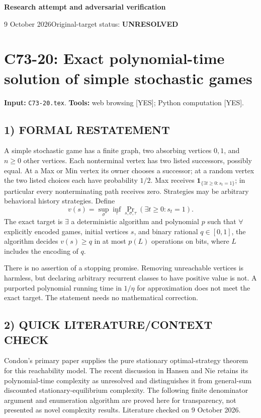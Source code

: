 \documentclass[11pt,a4paper]{article}
\theoremstyle{definition}
\theoremstyle{remark}
\begin{document}
{\large\bfseries Research attempt and adversarial verification}\par
9 October 2026\hfill Original-target status: \textbf{UNRESOLVED}\par
\section{C73-20: Exact polynomial-time solution of simple stochastic games}
\label{sec:C73-20}
\noindent\textbf{Input:} \texttt{C73-20.tex}. \quad\textbf{Tools:} web browsing [YES]; Python computation [YES].
\subsection*{1) FORMAL RESTATEMENT}
A simple stochastic game has a finite graph, two absorbing vertices $0,1$, and $n\geq0$ other vertices. Each nonterminal vertex has two listed successors, possibly equal. At a Max or Min vertex its owner chooses a successor; at a random vertex the two listed choices each have probability $1/2$. Max receives $\mathbf1_{\{\exists t\geq0:s_t=1\}}$; in particular every nonterminating path receives zero. Strategies may be arbitrary behavioral history strategies. Define
\[
 v(s)=\sup_\sigma\inf_\tau\Pr_{s,\sigma,\tau}(\exists t\geq0:s_t=1).
\]
The exact target is $\exists$ a deterministic algorithm and polynomial $p$ such that $\forall$ explicitly encoded games, initial vertices $s$, and binary rational $q\in[0,1]$, the algorithm decides $v(s)\geq q$ in at most $p(L)$ operations on bits, where $L$ includes the encoding of $q$.

There is no assertion of a stopping promise. Removing unreachable vertices is harmless, but declaring arbitrary recurrent classes to have positive value is not. A purported polynomial running time in $1/\eta$ for approximation does not meet the exact target. The statement needs no mathematical correction.

\subsection*{2) QUICK LITERATURE/CONTEXT CHECK}
Condon's primary paper \cite{condon} supplies the pure stationary optimal-strategy theorem for this reachability model. The recent discussion in Hansen and Nie \cite{hansen-nie} retains its polynomial-time complexity as unresolved and distinguishes it from general-sum discounted stationary-equilibrium complexity. The following finite denominator argument and enumeration algorithm are proved here for transparency, not presented as novel complexity results. Literature checked on 9 October 2026.
\end{document}
